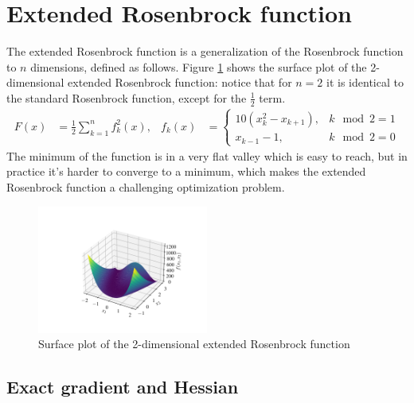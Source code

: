 \section{Extended Rosenbrock function}
\label{sec:extended_rosenbrock_results}

The extended Rosenbrock function is a generalization of the Rosenbrock function to $n$ dimensions, defined as follows.
Figure \ref{fig:extended_rosenbrock_surf} shows the surface plot of the 2-dimensional extended Rosenbrock function: notice that for $n=2$ it is identical to the standard Rosenbrock function, except for the $\frac12$ term.
\begin{align}
\label{eq:extended_rosenbrock}
F(x) &= \frac12 \sum_{k=1}^n f_k^2(x), &
f_k(x) &= \left \{ \begin{array}{ll}
10(x_k^2 - x_{k+1}), & k\mod 2 = 1\\
x_{k-1} -1, & k\mod 2 = 0
\end{array} \right .
\end{align}
The minimum of the function is in a very flat valley which is easy to reach, but in practice it's harder to converge to a minimum, which makes the extended Rosenbrock function a challenging optimization problem.

\begin{figure}
    \centering
    \includegraphics[width=0.5\textwidth]{figures/extended_rosenbrock_surf.pdf}
    \caption{Surface plot of the 2-dimensional extended Rosenbrock function}
    \label{fig:extended_rosenbrock_surf}
\end{figure}

\subsection{Exact gradient and Hessian}

